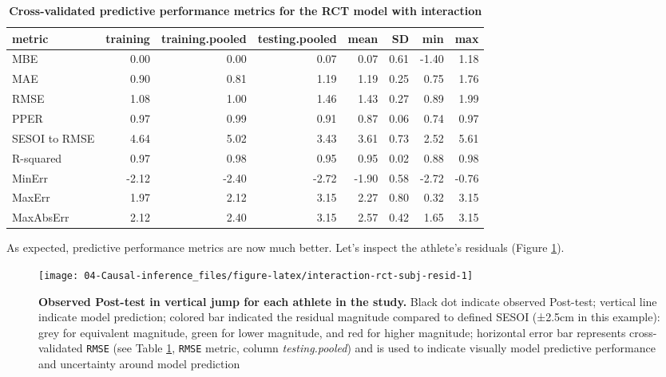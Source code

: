 \documentclass[
]{book}
\begin{document}
\begin{table}

\caption{\label{tab:interaction-rct-model-perf-metrics}\textbf{Cross-validated predictive performance metrics for the RCT model with interaction}}
\centering
\begin{tabular}[t]{lrrrrrrr}
\toprule
metric & training & training.pooled & testing.pooled & mean & SD & min & max\\
\midrule
MBE & 0.00 & 0.00 & 0.07 & 0.07 & 0.61 & -1.40 & 1.18\\
MAE & 0.90 & 0.81 & 1.19 & 1.19 & 0.25 & 0.75 & 1.76\\
RMSE & 1.08 & 1.00 & 1.46 & 1.43 & 0.27 & 0.89 & 1.99\\
PPER & 0.97 & 0.99 & 0.91 & 0.87 & 0.06 & 0.74 & 0.97\\
SESOI to RMSE & 4.64 & 5.02 & 3.43 & 3.61 & 0.73 & 2.52 & 5.61\\
\addlinespace
R-squared & 0.97 & 0.98 & 0.95 & 0.95 & 0.02 & 0.88 & 0.98\\
MinErr & -2.12 & -2.40 & -2.72 & -1.90 & 0.58 & -2.72 & -0.76\\
MaxErr & 1.97 & 2.12 & 3.15 & 2.27 & 0.80 & 0.32 & 3.15\\
MaxAbsErr & 2.12 & 2.40 & 3.15 & 2.57 & 0.42 & 1.65 & 3.15\\
\bottomrule
\end{tabular}
\end{table}

As expected, predictive performance metrics are now much better. Let's inspect the athlete's residuals (Figure \ref{fig:interaction-rct-subj-resid}).

\begin{figure}

{\centering \texttt{[image: 04-Causal-inference\_files/figure-latex/interaction-rct-subj-resid-1]} 

}

\caption{\textbf{Observed Post-test in vertical jump for each athlete in the study.} Black dot indicate observed Post-test; vertical line indicate model prediction; colored bar indicated the residual magnitude compared to defined SESOI (±2.5cm in this example): grey for equivalent magnitude, green for lower magnitude, and red for higher magnitude; horizontal error bar represents cross-validated \texttt{RMSE} (see Table \ref{tab:interaction-rct-model-perf-metrics}, \texttt{RMSE} metric, column \emph{testing.pooled}) and is used to indicate visually model predictive performance and uncertainty around model prediction}\label{fig:interaction-rct-subj-resid}
\end{figure}
\end{document}
